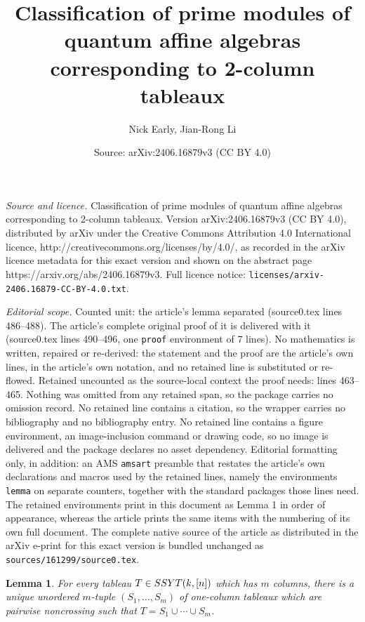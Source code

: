 \documentclass[10pt,a4paper]{amsart}
\title{Classification of prime modules of quantum affine algebras corresponding to 2-column tableaux}
\author{Nick Early, Jian-Rong Li}
\date{Source: arXiv:2406.16879v3 (CC BY 4.0)}
\newtheorem{lemma}{Lemma}
\begin{document}
\maketitle

\noindent\emph{Source and licence.} Classification of prime modules of quantum affine algebras corresponding to 2-column tableaux. Version arXiv:2406.16879v3 (CC BY 4.0), distributed by arXiv under the Creative Commons Attribution 4.0 International licence, http://creativecommons.org/licenses/by/4.0/, as recorded in the arXiv licence metadata for this exact version and shown on the abstract page https://arxiv.org/abs/2406.16879v3. Full licence notice: \texttt{licenses/arxiv-2406.16879-CC-BY-4.0.txt}.\par\smallskip

\noindent\textit{Editorial scope.} Counted unit: the article's lemma separated (source0.tex lines 486--488). The article's complete original proof of it is delivered with it (source0.tex lines 490--496, one \texttt{proof} environment of 7 lines). No mathematics is written, repaired or re-derived: the statement and the proof are the article's own lines, in the article's own notation, and no retained line is substituted or re-flowed.  Retained uncounted as the source-local context the proof needs: lines 463--465.  Nothing was omitted from any retained span, so the package carries no omission record.  No retained line contains a citation, so the wrapper carries no bibliography and no bibliography entry.  No retained line contains a figure environment, an image-inclusion command or drawing code, so no image is delivered and the package declares no asset dependency.  Editorial formatting only, in addition: an AMS \texttt{amsart} preamble that restates the article's own declarations and macros used by the retained lines, namely the environments \texttt{lemma} on separate counters, together with the standard packages those lines need.  The retained environments print in this document as Lemma 1 in order of appearance, whereas the article prints the same items with the numbering of its own full document.  The complete native source of the article as distributed in the arXiv e-print for this exact version is bundled unchanged as \texttt{sources/161299/source0.tex}.
\begin{lemma} \label{lem:semistandard tableau and noncrossing tuple}
For every tableau $T \in {\rm SSYT}(k, [n])$ which has $m$ columns, there is a unique unordered $m$-tuple $(S_1, \ldots, S_m)$ of one-column tableaux which are pairwise noncrossing such that $T = S_1 \cup \cdots \cup S_m$. 
\end{lemma}
\end{document}
